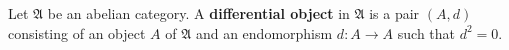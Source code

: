 Let $\mathfrak{A}$ be an abelian category. A \textbf{differential object} in $\mathfrak{A}$ is a pair $(A, d)$ consisting of an object $A$ of $\mathfrak{A}$ and an endomorphism $d: A \to A$ such that $d^2 = 0$.
